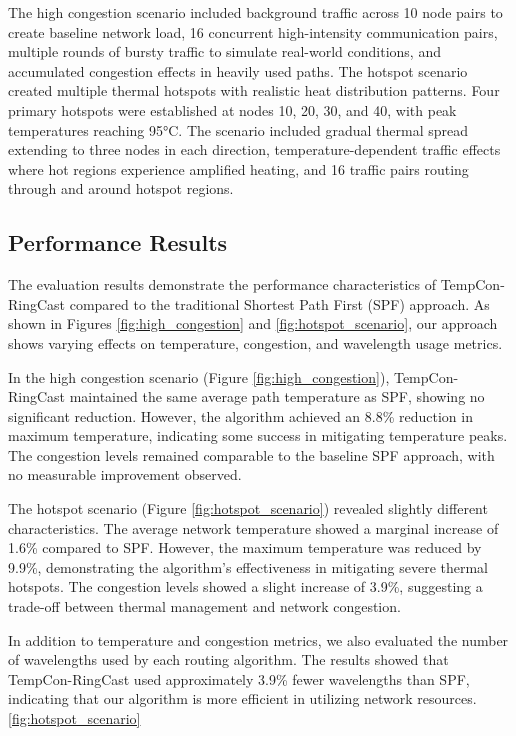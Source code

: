 \documentclass[conference]{IEEEtran}
\begin{document}
The high congestion scenario included background traffic across 10 node pairs to create baseline network load, 16 concurrent high-intensity communication pairs, multiple rounds of bursty traffic to simulate real-world conditions, and accumulated congestion effects in heavily used paths. The hotspot scenario created multiple thermal hotspots with realistic heat distribution patterns. Four primary hotspots were established at nodes 10, 20, 30, and 40, with peak temperatures reaching 95°C. The scenario included gradual thermal spread extending to three nodes in each direction, temperature-dependent traffic effects where hot regions experience amplified heating, and 16 traffic pairs routing through and around hotspot regions.

\subsection{Performance Results}
The evaluation results demonstrate the performance characteristics of TempCon-RingCast compared to the traditional Shortest Path First (SPF) approach. As shown in Figures \ref{fig:high_congestion} and \ref{fig:hotspot_scenario}, our approach shows varying effects on temperature, congestion, and wavelength usage metrics.

In the high congestion scenario (Figure \ref{fig:high_congestion}), TempCon-RingCast maintained the same average path temperature as SPF, showing no significant reduction. However, the algorithm achieved an 8.8\% reduction in maximum temperature, indicating some success in mitigating temperature peaks. The congestion levels remained comparable to the baseline SPF approach, with no measurable improvement observed.

The hotspot scenario (Figure \ref{fig:hotspot_scenario}) revealed slightly different characteristics. The average network temperature showed a marginal increase of 1.6\% compared to SPF. However, the maximum temperature was reduced by 9.9\%, demonstrating the algorithm's effectiveness in mitigating severe thermal hotspots. The congestion levels showed a slight increase of 3.9\%, suggesting a trade-off between thermal management and network congestion.

In addition to temperature and congestion metrics, we also evaluated the number of wavelengths used by each routing algorithm. The results showed that TempCon-RingCast used approximately 3.9\% fewer wavelengths than SPF, indicating that our algorithm is more efficient in utilizing network resources.\ref{fig:hotspot_scenario}
\end{document}
